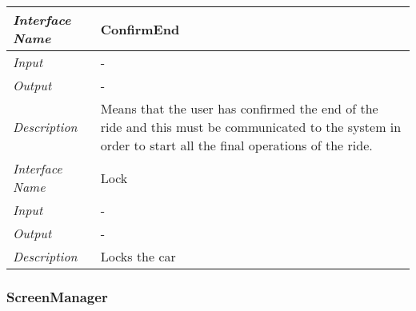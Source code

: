 \documentclass[11pt,a4paper]{report}
\begin{document}
\begin{tabularx}{\textwidth}{|>{\em}l|X|}
		\hline
		\hline
		Interface Name& ConfirmEnd\\
		\hline
		Input & -\\
		\hline
		Output & -\\
		\hline
		Description &Means that the user has confirmed the end of the ride and this must be communicated to the system in order to start all the final operations of the ride.\\
		\hline
		\hline
		Interface Name& Lock\\
		\hline
		Input & -\\
		\hline
		Output & -\\
		\hline
		Description &Locks the car\\
		\hline
	\end{tabularx}
\subsubsection{ScreenManager}
\end{document}
